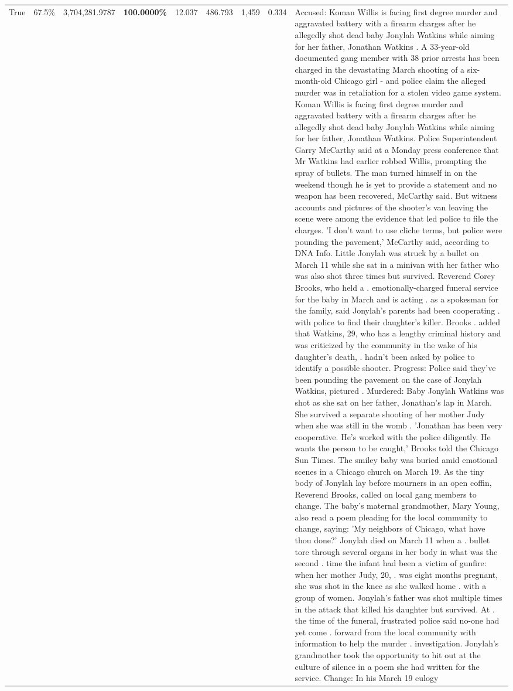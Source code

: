 \begin{table}[H]
\begin{tabular}{lllrlllll}
True & 67.5\% & 3,704,281.9787 & \bfseries \color{red} 100.0000\% & 12.037 & 486.793 & 1,459 & 0.334 & Accused: Koman Willis is facing first degree murder and aggravated battery with a firearm charges after he allegedly shot dead baby Jonylah Watkins while aiming for her father, Jonathan Watkins . A 33-year-old documented gang member with 38 prior arrests has been charged in the devastating March shooting of a six-month-old Chicago girl - and police claim the alleged murder was in retaliation for a stolen video game system. Koman Willis is facing first degree murder and aggravated battery with a firearm charges after he allegedly shot dead baby Jonylah Watkins while aiming for her father, Jonathan Watkins. Police Superintendent Garry McCarthy said at a Monday press conference that Mr Watkins had earlier robbed Willis, prompting the spray of bullets. The man turned himself in on the weekend though he is yet to provide a statement and no weapon has been recovered, McCarthy said. But witness accounts and pictures of the shooter's van leaving the scene were among the evidence that led police to file the charges. 'I don't want to use cliche terms, but police were pounding the pavement,' McCarthy said, according to DNA Info. Little Jonylah was struck by a bullet on March 11 while she sat in a minivan with her father who was also shot three times but survived. Reverend Corey Brooks, who held a . emotionally-charged funeral service for the baby in March and is acting . as a spokesman for the family, said Jonylah's parents had been cooperating . with police to find their daughter's killer. Brooks . added that Watkins, 29, who has a lengthy criminal history and was criticized by the community in the wake of his daughter's death, . hadn't been asked by police to identify a possible shooter. Progress: Police said they've been pounding the pavement on the case of Jonylah Watkins, pictured . Murdered: Baby Jonylah Watkins was shot as she sat on her father, Jonathan's lap in March. She survived a separate shooting of her mother Judy when she was still in the womb . 'Jonathan has been very cooperative. He's worked with the police diligently. He wants the person to be caught,' Brooks told the Chicago Sun Times. The smiley baby was buried amid emotional scenes in a Chicago church on March 19. As the tiny body of Jonylah lay before mourners in an open coffin, Reverend Brooks, called on local gang members to change. The baby's maternal grandmother, Mary Young, also read a poem pleading for the local community to change, saying: 'My neighbors of Chicago, what have thou done?' Jonylah died on March 11 when a . bullet tore through several organs in her body in what was the second . time the infant had been a victim of gunfire: when her mother Judy, 20, . was eight months pregnant, she was shot in the knee as she walked home . with a group of women. Jonylah's father was shot multiple times in the attack that killed his daughter but survived. At . the time of the funeral, frustrated police said no-one had yet come . forward from the local community with information to help the murder . investigation. Jonylah's grandmother took the opportunity to hit out at the culture of silence in a poem she had written for the service. Change: In his March 19 eulogy 
\end{tabular}
\end{table}
